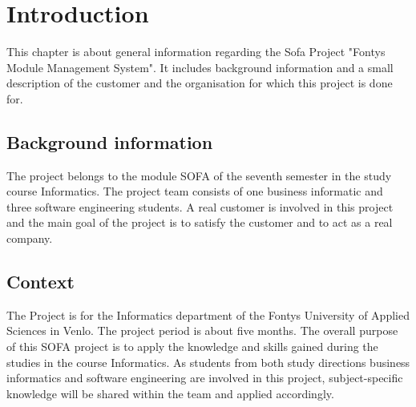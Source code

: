 \chapter{Introduction}
This chapter is about general information regarding the Sofa Project "Fontys Module Management System".
It includes background information and a small description of the customer and the organisation for which
this project is done for.

\section{Background information}
The project belongs to the module SOFA of the seventh semester in the study course Informatics.
The project team consists of one business informatic and three software engineering students. A real customer is involved in this project
and the main goal of the project is to satisfy the customer and to act as a real company.

\section{Context}
The Project is for the Informatics department of the Fontys University of Applied Sciences in Venlo. The project period is about five months. 
The overall purpose of this SOFA project is to apply the knowledge and skills gained
during the studies in the course Informatics. As students from both study directions business informatics
and software engineering are involved in this project, subject-specific knowledge will be shared within the team
and applied accordingly.